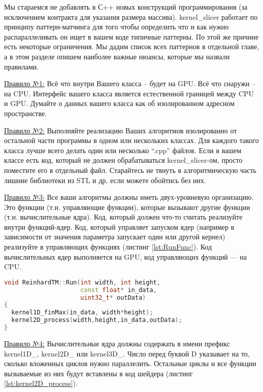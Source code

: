 \documentclass[11pt,fleqn,english,russian]{report} %
\begin{document}
Мы стараемся не добавлять в С++ новых конструкций программирования (за исключением контракта для указания размера массива). kernel\_slicer работает по принципу паттерн-матчинга для того чтобы определить что и как нужно распараллеливать он ищет в вашем коде типичные паттерны. По этой же причине есть некоторые ограничения. Мы дадим список всех паттернов в отдельной главе, а в этом разделе опишем наиболее важные нюансы, которые мы назвали правилами.

\underline{Правило №1:} Всё что внутри Вашего класса -- будет на GPU. Всё что снаружи -- на CPU. Интерфейс вашего класса является естественной границей между CPU и GPU. Думайте о данных вашего класса как об изолированном адресном пространстве.

\underline{Правило №2:} Выполняйте реализацию Ваших алгоритмов изолированно от остальной части программы в одном или нескольких классах. Для каждого такого класса лучше всего делать один или несколько ``.cpp'' файлов. Если в вашем классе есть код, который не должен обрабатываться kernel\_slicer-ом, просто поместите его в отдельный файл. Старайтесь не тянуть в алгоритмическую часть лишние библиотеки из STL и др, если можете обойтись без них.

\underline{Правило №3:} Все ваши алгоритмы должны иметь двух-уровневую организацию. Это функции (т.н. управляющие функции), которые вызывают другие функции (т.н. вычислительные ядра). Код, который должен что-то считать реализуйте внутри функций-ядер. Код, который управляет запуском ядер (например в зависимости от значения параметра запускает один или другой кернел) реализуйте в управляющих функциях (листинг \ref{lst:RunFunc}). Код вычислительных ядер выполняется на GPU, код управляющих функций --- на CPU.

\begin{lstlisting}[language=C++, 
	               caption=реализация управляющей функции вызывающей вычислительные ядра, 
	               label=lst:RunFunc]	
void ReinhardTM::Run(int width, int height, 
                     const float* in_data, 
                     uint32_t* outData)
{
  kernel1D_finMax(in_data, width*height);
  kernel2D_process(width,height,in_data,outData);
}
\end{lstlisting}

\underline{Правило №4:} Вычислительные ядра должны содержать в имени префикс kernel1D\_, kernel2D\_ или kernel3D\_. Число перед буквой D указывает на то, сколько вложенных циклов нужно параллелить. Остальные циклы и все функции вызываемые из них будут вставлены в код шейдера (листинг \ref{lst:kernel2D_process}). 
\end{document}
